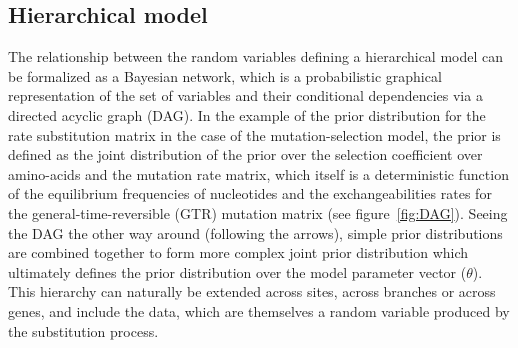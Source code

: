 \subsection{Hierarchical model}
\label{sec:intro-hierarchical-models}
The relationship between the random variables defining a hierarchical model can be formalized as a Bayesian network, which is a probabilistic graphical representation of the set of variables and their conditional dependencies via a directed acyclic graph (DAG).
In the example of the \gls{prior} distribution for the rate \gls{substitution} matrix in the case of the mutation-selection model, the prior is defined as the joint distribution of the \gls{prior} over the selection coefficient over amino-acids and the mutation rate matrix, which itself is a deterministic function of the equilibrium frequencies of nucleotides and the exchangeabilities rates for the general-time-reversible (GTR) mutation matrix (see figure~\ref{fig:DAG}).
Seeing the DAG the other way around (following the arrows), simple \gls{prior} distributions are combined together to form more complex joint \gls{prior} distribution which ultimately defines the \gls{prior} distribution over the model parameter vector ($\theta$).
This hierarchy can naturally be extended across sites, across branches or across genes, and include the data, which are themselves a random variable produced by the substitution process.
